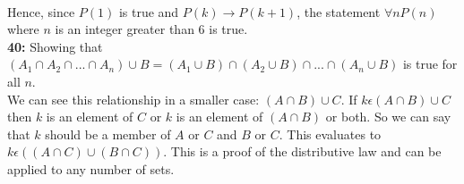 \documentclass[12pt]{article}  %
\newcommand{\IMPLIES}{\rightarrow}
\begin{document}
\\
Hence, since $P(1)$ is true and $P(k) \IMPLIES P(k + 1)$, the statement
$\forall n P(n)$ where $n$ is an integer greater than 6 is true.
\noindent
\\
{\bf 40:}
Showing that $(A_{1} \cap A_{2} \cap ... \cap A_{n}) \cup B= (A_{1} \cup B) \cap (A_{2} \cup B) \cap ... \cap (A_{n} \cup B)$ is true for all $n$.
\\
We can see this relationship in a smaller case: $(A \cap B) \cup C$.
If $k \epsilon (A \cap B) \cup C$ then $k$ is an element of $C$ or 
$k$ is an element of $(A \cap B)$ or both. So we can say that $k$ should 
be a member of $A$ or $C$ and $B$ or $C$. This evaluates to $k \epsilon ((A \cap C) \cup (B \cap C))$.
This is a proof of the distributive law and can be applied to any number of sets.
\end{document}
